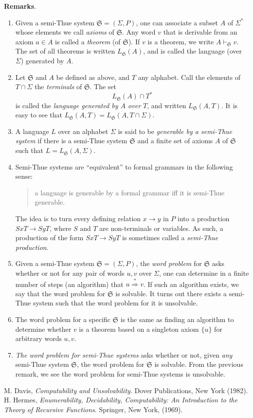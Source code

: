 \documentclass[12pt]{article}
\newcommand{\derive}{\stackrel{*}{\Rightarrow}}
\begin{document}
\textbf{Remarks}.
\begin{enumerate}
\item Given a semi-Thue system $\mathfrak{S}=(\Sigma,P)$, one can associate a subset $A$ of $\Sigma^*$ whose elements we call \emph{axioms} of $\mathfrak{S}$.  Any word $v$ that is derivable from an axiom $a\in A$ is called a \emph{theorem} (of $\mathfrak{S}$).  If $v$ is a theorem, we write $A \vdash_{\mathfrak{S}} v$.  The set of all theorems is written $L_{\mathfrak{S}}(A)$, and is called the language (over $\Sigma$) generated by $A$.
\item Let $\mathfrak{S}$ and $A$ be defined as above, and $T$ any alphabet.  Call the elements of $T\cap \Sigma$ the \emph{terminals} of $\mathfrak{S}$.  The set 
$$L_{\mathfrak{S}}(A)\cap T^*$$
is called the \emph{language generated by $A$ over $T$}, and written $L_{\mathfrak{S}}(A,T)$.  It is easy to see that  $L_{\mathfrak{S}}(A,T)=L_{\mathfrak{S}}(A,T\cap \Sigma)$.
\item A language $L$ over an alphabet $\Sigma$ is said to be \emph{generable by a semi-Thue system} if there is a semi-Thue system $\mathfrak{S}$ and a finite set of axioms $A$ of $\mathfrak{S}$ such that $L= L_{\mathfrak{S}}(A,\Sigma)$.
\item Semi-Thue systems are ``equivalent'' to formal grammars in the following sense: 
\begin{quote} a language is generable by a formal grammar iff it is semi-Thue generable. \end{quote}  The idea is to turn every defining relation $x\to y$ in $P$ into a production $SxT\to SyT$, where $S$ and $T$ are non-terminals or variables.  As such, a production of the form $SxT\to SyT$ is sometimes called a \emph{semi-Thue production}.
\item Given a semi-Thue system $\mathfrak{S}=(\Sigma,P)$, the \emph{word problem} for $\mathfrak{S}$ asks whether or not for any pair of words $u,v$ over $\Sigma$, one can determine in a finite number of steps (an algorithm) that $u\derive v$.  If such an algorithm exists, we say that the word problem for $\mathfrak{S}$ is solvable.  It turns out there exists a semi-Thue system such that the word problem for it is unsolvable.
\item The word problem for a specific $\mathfrak{S}$ is the same as finding an algorithm to determine whether $v$ is a theorem based on a singleton axiom $\lbrace u\rbrace$ for arbitrary words $u,v$.
\item \emph{The word problem for semi-Thue systems} asks whether or not, given \emph{any} semi-Thue system $\mathfrak{S}$, the word problem for $\mathfrak{S}$ is solvable.  From the previous remark, we see the word problem for semi-Thue systems is unsolvable.
\end{enumerate}

\begin{thebibliography}{9}
 M. Davis, {\em Computability and Unsolvability}. Dover Publications, New York (1982).
 H. Hermes, {\em Enumerability, Decidability, Computability: An Introduction to the Theory of Recursive Functions}. Springer, New York, (1969).
\end{thebibliography}

\end{document}
